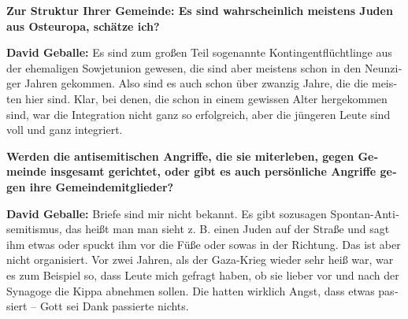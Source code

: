 \begin{otherlanguage}{ngerman}

\textbf{Zur Struktur Ihrer Gemeinde: Es sind wahrscheinlich meistens Juden aus Osteuropa, schätze ich?}

\textbf{David Geballe:} Es sind zum großen Teil sogenannte Kontingentflüchtlinge aus der ehemaligen Sowjetunion gewesen, die sind aber meistens schon in den Neunziger Jahren gekommen. Also sind es auch schon über zwanzig Jahre, die die meisten hier sind. Klar, bei denen, die schon in einem gewissen Alter hergekommen sind, war die Integration nicht ganz so erfolgreich, aber die jüngeren Leute sind voll und ganz integriert. 





\textbf{Werden die antisemitischen Angriffe, die sie miterleben, gegen Gemeinde insgesamt gerichtet, oder gibt es auch persönliche Angriffe gegen ihre Gemeindemitglieder?} 

\textbf{David Geballe:} Briefe sind mir nicht bekannt. Es gibt sozusagen Spontan-Antisemitismus, das heißt man man sieht z. B. einen Juden auf der Straße und sagt ihm etwas oder spuckt ihm vor die Füße oder sowas in der Richtung. Das ist aber nicht organisiert. Vor zwei Jahren, als der Gaza-Krieg wieder sehr heiß war, war es zum Beispiel so, dass Leute mich gefragt haben, ob sie lieber vor und nach der Synagoge die Kippa abnehmen sollen. Die hatten wirklich Angst, dass etwas passiert – Gott sei Dank passierte nichts. 


\end{otherlanguage}
